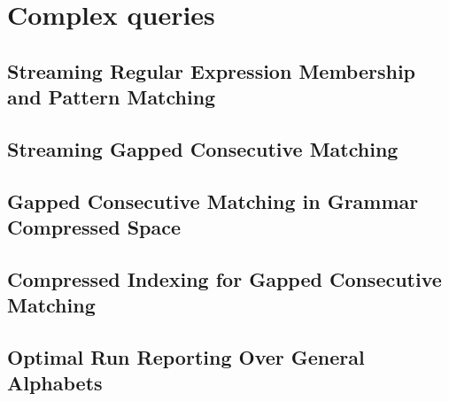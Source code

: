 \part{Complex queries}

\mainmatter
\chapter{Streaming Regular Expression Membership and Pattern Matching}\label{chap:regexp}


\chapter{Streaming Gapped Consecutive Matching}\label{chap:gapped_stream}
\mainmatter
\chapter{Gapped Consecutive Matching in Grammar Compressed Space}\label{chap:gapped_pm}
\mainmatter
\chapter{Compressed Indexing for Gapped Consecutive Matching}\label{chap:gapped_index}

\mainmatter
\chapter{Optimal Run Reporting Over General Alphabets}\label{chap:squares}
